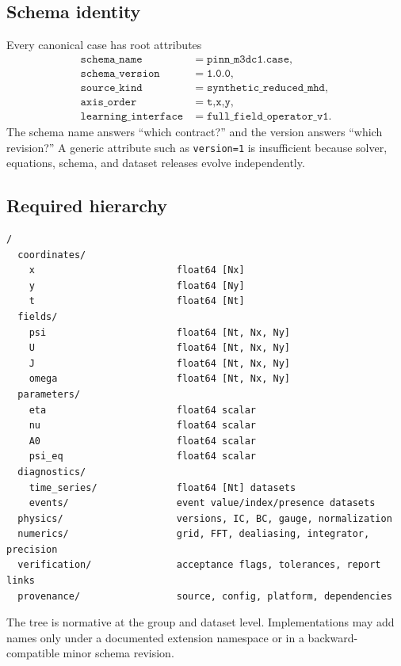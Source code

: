 \documentclass[11pt]{article}
\newcommand{\code}[1]{\texttt{#1}}
\begin{document}
\subsection{Schema identity}

Every canonical case has root attributes
\begin{align}
\code{schema\_name}&=\code{pinn\_m3dc1.case},\\
\code{schema\_version}&=\code{1.0.0},\\
\code{source\_kind}&=\code{synthetic\_reduced\_mhd},\\
\code{axis\_order}&=\code{t,x,y},\\
\code{learning\_interface}&=\code{full\_field\_operator\_v1}.
\end{align}
The schema name answers ``which contract?'' and the version answers ``which revision?'' A generic attribute such as \code{version=1} is insufficient because solver, equations, schema, and dataset releases evolve independently.

\subsection{Required hierarchy}

\begin{verbatim}
/
  coordinates/
    x                         float64 [Nx]
    y                         float64 [Ny]
    t                         float64 [Nt]
  fields/
    psi                       float64 [Nt, Nx, Ny]
    U                         float64 [Nt, Nx, Ny]
    J                         float64 [Nt, Nx, Ny]
    omega                     float64 [Nt, Nx, Ny]
  parameters/
    eta                       float64 scalar
    nu                        float64 scalar
    A0                        float64 scalar
    psi_eq                    float64 scalar
  diagnostics/
    time_series/              float64 [Nt] datasets
    events/                   event value/index/presence datasets
  physics/                    versions, IC, BC, gauge, normalization
  numerics/                   grid, FFT, dealiasing, integrator, precision
  verification/               acceptance flags, tolerances, report links
  provenance/                 source, config, platform, dependencies
\end{verbatim}

The tree is normative at the group and dataset level. Implementations may add names only under a documented extension namespace or in a backward-compatible minor schema revision.
\end{document}
